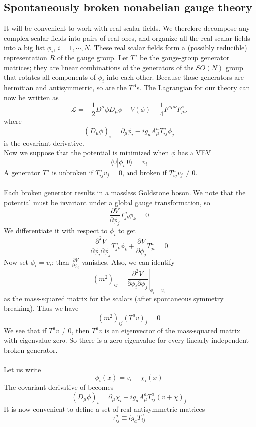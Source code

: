 \documentclass[cyan]{elegantnote}
\begin{document}
\subsection{Spontaneously broken nonabelian gauge theory}
It will be convenient to work with real scalar fields. We
therefore decompose any complex scalar fields into pairs of real ones, and organize all the real scalar fields into a big list $\phi_i$, $i = 1,\cdots,N$. 
These real scalar fields form a (possibly reducible) representation $R$ of the gauge group. Let $T^a$ be the gauge-group generator matrices; they are linear combinations of the generators of the $SO(N)$ group that rotates all components of $\phi_i$ into each other. Because these generators are hermitian and antisymmetric, so are the  $T^A$s. The Lagrangian for our theory can now be written as
\[\mathcal{L} = -\frac{1}{2}D^{\mu}\phi D_{\mu}\phi - V(\phi) - \frac{1}{4}F^{a\mu\nu}F^a_{\mu\nu}\]
where
\[(D_{\mu}\phi)_i = \partial_{\mu}\phi_i - ig_aA^a_{\mu}T^a_{ij}\phi_j\]
is the covariant derivative.
\\
Now we suppose that the potential is minimized when $\phi$ has a VEV
\[\langle 0 | \phi_i | 0 \rangle = v_i\]
A generator $T^a$ is unbroken if $T^a_{ij}v_j = 0$, and broken if $T^a_{ij}v_j \neq 0$.
\\ \\
Each broken generator results in a massless Goldstone boson. We note that the potential must be invariant under a global gauge transformation, so
\[\frac{\partial V}{\partial \phi_j} T^a_{jk}\phi_k = 0\]
We differentiate it with respect to $\phi_i$ to get
\[\frac{\partial^2 V}{\partial \phi_i \partial \phi_j} T^a_{jk}\phi_k + \frac{\partial V}{\partial \phi_j} T^a_{ji} = 0 \]
Now set $\phi_i = v_i$; then $\frac{\partial V}{\partial \phi_i}$ vanishes. Also, we can identify
\[(m^2)_{ij} = \left. \frac{\partial^2 V}{\partial \phi_i \partial \phi_j} \right|_{\phi_i = v_i}\]
as the mass-squared matrix for the scalars (after spontaneous symmetry breaking). Thus we have
\[(m^2)_{ij} (T^av)_j = 0\]
We see that if $T^av \neq 0$, then $T^av$ is an eigenvector of the mass-squared matrix with eigenvalue zero. So there is a zero eigenvalue for every linearly independent broken generator.
\\ \\
Let us write
\[\phi_i(x) = v_i + \chi_i(x)\]
The covariant derivative of becomes
\[(D_{\mu}\phi)_i = \partial_{\mu}\chi_i - ig_aA^a_{\mu}T^a_{ij}(v+\chi)_j\]
It is now convenient to define a set of real antisymmetric matrices
\[\tau^a_{ij} \equiv ig_aT^a_{ij}\]
\end{document}
